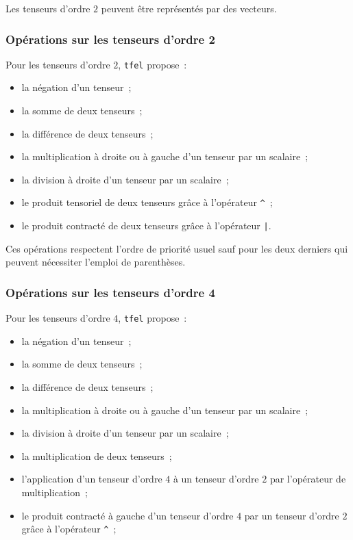 \documentclass[rectoverso,pleiades,pstricks,leqno,anti]{texmf/note_technique_2010}
\newcommand{\tfel}{\texttt{tfel}}
\begin{document}
Les tenseurs d'ordre \(2\) peuvent être représentés par des vecteurs.

\subsubsection{Opérations sur les tenseurs d'ordre 2}

Pour les tenseurs d'ordre \(2\), \tfel{} propose~:
\begin{itemize}
\item la négation d'un tenseur~;
\item la somme de deux tenseurs~;
\item la différence de deux tenseurs~;
\item la multiplication à droite ou à gauche d'un tenseur par un scalaire~;
\item la division à droite d'un tenseur par un scalaire~;
\item le produit tensoriel de deux tenseurs grâce à l'opérateur \texttt{\^}~;
\item le produit contracté de deux tenseurs grâce à l'opérateur \texttt{|}.
\end{itemize}

Ces opérations respectent l'ordre de priorité usuel sauf pour les deux
derniers qui peuvent nécessiter l'emploi de parenthèses.

\subsubsection{Opérations sur les tenseurs d'ordre 4}

Pour les tenseurs d'ordre \(4\), \tfel{} propose~:
\begin{itemize}
\item la négation d'un tenseur~;
\item la somme de deux tenseurs~;
\item la différence de deux tenseurs~;
\item la multiplication à droite ou à gauche d'un tenseur par un scalaire~;
\item la division à droite d'un tenseur par un scalaire~;
\item la multiplication de deux tenseurs~;
\item l'application d'un tenseur d'ordre \(4\) à un tenseur d'ordre
  \(2\) par l'opérateur de multiplication~;
\item le produit contracté à gauche d'un tenseur d'ordre \(4\) par un
  tenseur d'ordre \(2\) grâce à l'opérateur \texttt{\^}~;
\end{itemize}
\end{document}

